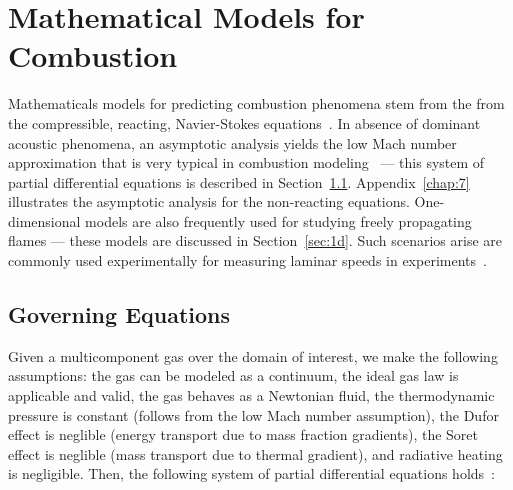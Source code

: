 \chapter{Mathematical Models for Combustion}\label{chap:model}

Mathematicals models for predicting combustion phenomena stem from the
from the compressible, reacting, Navier-Stokes equations~\cite{PoinsotVeynante3ed}. In absence
of dominant acoustic phenomena, an asymptotic analysis yields the low
Mach number approximation that is very typical in combustion
modeling~\cite{Muller,Codina,PoinsotVeynante3ed,Kuo} --- this system of partial differential equations is
described in Section~\ref{sec:lowmach}. Appendix~\ref{chap:7}
illustrates the asymptotic analysis for the non-reacting equations. One-dimensional models are
also frequently used for studying freely propagating flames --- these
models are discussed in Section~\ref{sec:1d}. Such
scenarios arise are commonly used experimentally for measuring laminar
speeds in experiments~\cite{Streng}.

\section{Governing Equations}\label{sec:lowmach}

Given a multicomponent gas over the domain of interest, we make the
following assumptions: the gas can be modeled as a continuum, the
ideal gas law is applicable and valid, the gas behaves as a Newtonian
fluid, the thermodynamic pressure
is constant (follows from the low Mach number assumption), the Dufor
effect is neglible (energy transport due to mass fraction gradients),
the Soret effect is neglible (mass transport due to thermal
gradient), and radiative heating is negligible. Then, the following system of partial differential
equations holds~\cite{PoinsotVeynante3ed}:

